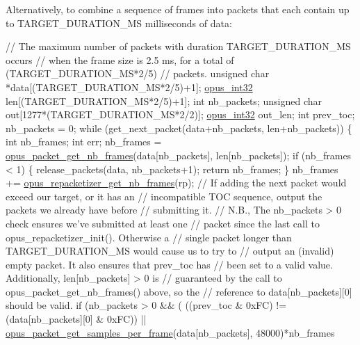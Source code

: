 Alternatively, to combine a sequence of frames into packets that each contain up to {\ttfamily T\+A\+R\+G\+E\+T\+\_\+\+D\+U\+R\+A\+T\+I\+O\+N\+\_\+\+MS} milliseconds of data\+: 
\begin{DoxyCode}
\textcolor{comment}{// The maximum number of packets with duration TARGET\_DURATION\_MS occurs}
\textcolor{comment}{// when the frame size is 2.5 ms, for a total of (TARGET\_DURATION\_MS*2/5)}
\textcolor{comment}{// packets.}
\textcolor{keywordtype}{unsigned} \textcolor{keywordtype}{char} *data[(TARGET\_DURATION\_MS*2/5)+1];
\hyperlink{opus__types_8h_aa4d309d6f80b99dbabebc8f98879ab9a}{opus\_int32} len[(TARGET\_DURATION\_MS*2/5)+1];
\textcolor{keywordtype}{int} nb\_packets;
\textcolor{keywordtype}{unsigned} \textcolor{keywordtype}{char} out[1277*(TARGET\_DURATION\_MS*2/2)];
\hyperlink{opus__types_8h_aa4d309d6f80b99dbabebc8f98879ab9a}{opus\_int32} out\_len;
\textcolor{keywordtype}{int} prev\_toc;
nb\_packets = 0;
\textcolor{keywordflow}{while} (get\_next\_packet(data+nb\_packets, len+nb\_packets))
\{
  \textcolor{keywordtype}{int} nb\_frames;
  \textcolor{keywordtype}{int} err;
  nb\_frames = \hyperlink{group__opus__decoder_ga064cb2ed9e77a934cd7db6c13b02c584}{opus\_packet\_get\_nb\_frames}(data[nb\_packets], len[nb\_packets]);
  \textcolor{keywordflow}{if} (nb\_frames < 1)
  \{
    release\_packets(data, nb\_packets+1);
    \textcolor{keywordflow}{return} nb\_frames;
  \}
  nb\_frames += \hyperlink{group__opus__repacketizer_ga2cad98d04458aafdf6bb9f22f34ea7c0}{opus\_repacketizer\_get\_nb\_frames}(rp);
  \textcolor{comment}{// If adding the next packet would exceed our target, or it has an}
  \textcolor{comment}{// incompatible TOC sequence, output the packets we already have before}
  \textcolor{comment}{// submitting it.}
  \textcolor{comment}{// N.B., The nb\_packets > 0 check ensures we've submitted at least one}
  \textcolor{comment}{// packet since the last call to opus\_repacketizer\_init(). Otherwise a}
  \textcolor{comment}{// single packet longer than TARGET\_DURATION\_MS would cause us to try to}
  \textcolor{comment}{// output an (invalid) empty packet. It also ensures that prev\_toc has}
  \textcolor{comment}{// been set to a valid value. Additionally, len[nb\_packets] > 0 is}
  \textcolor{comment}{// guaranteed by the call to opus\_packet\_get\_nb\_frames() above, so the}
  \textcolor{comment}{// reference to data[nb\_packets][0] should be valid.}
  \textcolor{keywordflow}{if} (nb\_packets > 0 && (
      ((prev\_toc & 0xFC) != (data[nb\_packets][0] & 0xFC)) ||
      \hyperlink{group__opus__decoder_gab2a955acced631c6cb7876bbdc7953d4}{opus\_packet\_get\_samples\_per\_frame}(data[nb\_packets], 48000)*nb\_frames

\end{DoxyCode}
